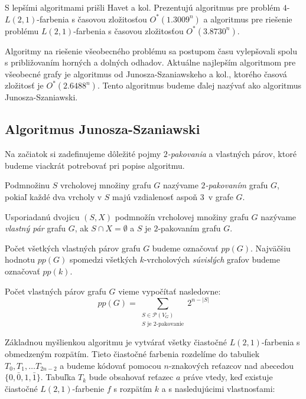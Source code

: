 S lepšími algoritmami prišli Havet a kol. Prezentujú algoritmus pre problém $4$-$L(2,1)$-farbenia
s časovou zložitosťou $O^*(1.3009^n)$ a algoritmus pre riešenie problému $L(2,1)$-farbenia s
časovou zložitosťou $O^*(3.8730^n)$.

Algoritmy na riešenie všeobecného problému sa postupom času vylepšovali spolu s približovaním
horných a dolných odhadov. Aktuálne najlepším algoritmom pre všeobecné grafy je algoritmus
od Junosza-Szaniawskeho a kol., ktorého časová zložitosť je $O^*(2.6488^n)$\cite{junosza_fast}.
Tento algoritmus budeme ďalej nazývať ako algoritmus Junosza-Szaniawski.

\subsection{Algoritmus Junosza-Szaniawski}

Na začiatok si zadefinujeme dôležité pojmy $2$\emph{-pakovania} a vlastných párov, ktoré budeme
viackrát potrebovať pri popise algoritmu.

\begin{defn}
    Podmnožinu $S$ vrcholovej množiny grafu $G$ nazývame $2$\emph{-pakovaním} grafu $G$, pokiaľ každé
    dva vrcholy v $S$ majú vzdialenosť aspoň $3$ v grafe $G$.
\end{defn}

\begin{defn}
    Usporiadanú dvojicu $(S, X)$ podmnožín vrcholovej množiny grafu $G$ nazývame \emph{vlastný pár}
    grafu $G$, ak $S \cap X = \emptyset$ a $S$ je $2$-pakovaním grafu $G$.

    Počet všetkých vlastných párov grafu $G$ budeme označovať $pp(G)$. Najväčšiu hodnotu $pp(G)$
    spomedzi všetkých $k$-vrcholových \emph{súvislých} grafov budeme označovať $pp(k)$.
\end{defn}

\begin{pozn}
    \label{pp_g}
    Počet vlastných párov grafu $G$ vieme vypočítať nasledovne:
    $$pp(G) = \sum_{\substack{S \in \mathcal{P}(V_G) \\ S \textrm{ je } 2 \textrm{-pakovanie}}} 2^{n - |S|}$$
\end{pozn}

Základnou myšlienkou algoritmu je vytvárať všetky čiastočné $L(2,1)$-farbenia s obmedzeným rozpätím.
Tieto čiastočné farbenia rozdelíme do tabuliek $T_0, T_1, \ldots T_{2n-2}$ a budeme kódovať pomocou
$n$-znakových reťazcov nad abecedou $\{0, \bar{0}, 1, \bar{1}\}$. Tabuľka $T_k$ bude obsahovať
reťazec $a$ práve vtedy, keď existuje čiastočné $L(2,1)$-farbenie $f$ s rozpätím $k$ a s nasledujúcimi vlastnosťami:

